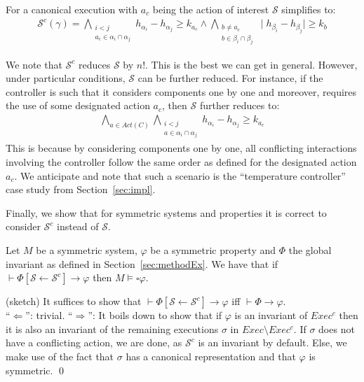 \documentclass{LMCS}
\newcommand{\sep}{\mathcal{S}}
\newcommand{\exg}{Exec}
\newcommand{\exc}{Exec^{c}}
\newcommand{\sepc}{\sep^{c}}
\theoremstyle{plain}\newtheorem{remark}[thm]{Remark}
\theoremstyle{plain}\newtheorem{example}[thm]{Example}
\begin{document}
For a canonical execution with $a_c$ being the action of interest
$\sep$ simplifies to:
\begin{align*}
  \sepc(\gamma) = \bigwedge_{\substack{i < j\\a_c \in \alpha_i \cap
      \alpha_j}} h_{\alpha_i} - h_{\alpha_j} \geq k_{a_c} \wedge
  \displaystyle{\bigwedge_{\substack{b \neq a_c\\ b \in \beta_i \cap \beta_j}}} \mid
  h_{\beta_i} - h_{\beta_j} \mid \geq k_b
\end{align*} 

We note that $\sepc$ reduces $\sep$ by $n!$. This is the best we can
get in general. However, under particular conditions, $\sep$ can be
further reduced. For instance, if the controller is such that it
considers components one by one and moreover, requires the use of some
designated action $a_c$, then $\sep$ further reduces to:
\begin{align*}
\displaystyle{\bigwedge_{a\in
    Act(C)}}\displaystyle{\bigwedge_{\substack{i < j\\a \in
      \alpha_i \cap \alpha_j}}} h_{\alpha_i} - h_{\alpha_j} \geq k_{a_c}
\end{align*}
This is because by considering components one by one, all conflicting
interactions involving the controller follow the same order as defined
for the designated action $a_c$. We anticipate and note that such a
scenario is the ``temperature controller'' case study from
Section~\ref{sec:impl}.

Finally, we show that for symmetric systems and properties it is
correct to consider $\sepc$ instead of $\sep$.
\begin{prop}
\label{prop:reds}
Let $M$ be a symmetric system, $\varphi$ be a symmetric property and
$\Phi$ the global invariant as defined in
Section~\ref{sec:methodEx}. We have that if $\vdash \Phi[\sep
\leftarrow \sepc] \rightarrow \varphi$ then $M \models \square
\varphi$.
\end{prop}
\proof (sketch) It suffices to show that $\vdash \Phi[\sep \leftarrow
\sepc] \rightarrow \varphi$ iff $\vdash \Phi
\rightarrow \varphi$. \\
``$\Leftarrow$'': trivial.  ``$\Rightarrow$'': It boils down to show
that if $\varphi$ is an invariant of $\exc$ then it is also an
invariant of the remaining executions $\sigma$ in $\exg \setminus
\exc$. If $\sigma$ does not have a conflicting action, we are done, as
$\sepc$ is an invariant by default. Else, we make use of the fact that
$\sigma$ has a canonical representation and that $\varphi$ is
symmetric.  \qed
\end{document}
